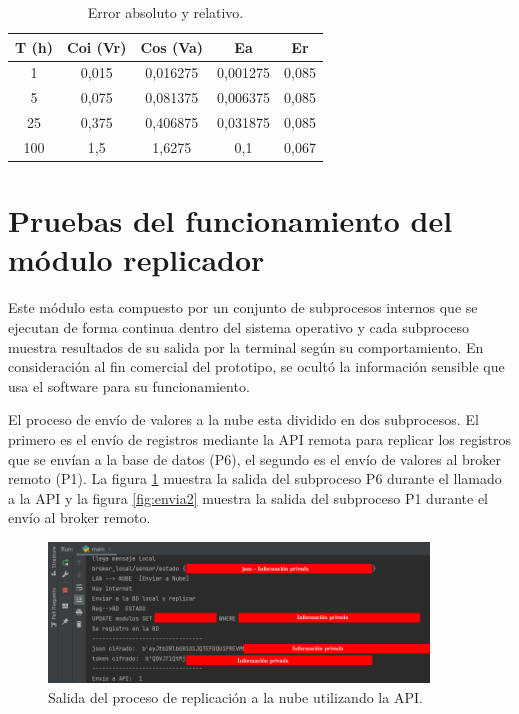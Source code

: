 \vspace{0.5cm}
\begin{table}[h]
	\centering
	\caption[Error absoluto y relativo]{Error absoluto y relativo.}
	\begin{tabular}{c c c c c}    
		\toprule
		\textbf{T (h)} & \textbf{Coi (Vr)} &\textbf{Cos (Va)} &\textbf{Ea} &\textbf{Er}\\
		\midrule
		1 & 0,015 & 0,016275 & 0,001275 & 0,085 \\		
		5 & 0,075 & 0,081375 & 0,006375 & 0,085 \\
		25 & 0,375 & 0,406875 & 0,031875 & 0,085\\		
		100 & 1,5 & 1,6275 & 0,1 & 0,067\\		
		
		\bottomrule
		\hline
	\end{tabular}
	\label{tab:tablaerror}
\end{table}

\section{Pruebas del funcionamiento del módulo replicador}

Este módulo esta compuesto por un conjunto de subprocesos internos que se ejecutan de forma continua dentro del sistema operativo y cada subproceso muestra resultados de su salida por la terminal según su comportamiento. En consideración al fin comercial del prototipo, se ocultó la información sensible que usa el software para su funcionamiento.

El proceso de envío de valores a la nube esta dividido en dos subprocesos. El primero es el envío de registros mediante la API remota para replicar los registros que se envían a la base de datos (P6), el segundo es el envío de valores al broker remoto (P1). La figura \ref{fig:envia1} muestra la salida del subproceso P6 durante el llamado a la API y la figura \ref{fig:envia2} muestra la salida del subproceso P1 durante el envío al broker remoto.

\begin{figure}[htpb]
\centering 
\includegraphics[width=0.9\textwidth]{./Figures/test/replicador/enviaAPI.png}
\caption{Salida del proceso de replicación a la nube utilizando la API.}
\label{fig:envia1}
\end{figure}

